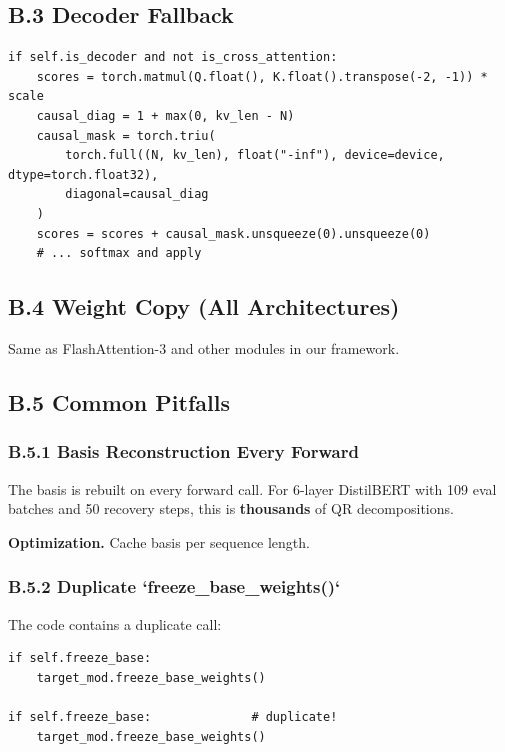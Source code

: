 \subsection{B.3 Decoder Fallback}

\begin{lstlisting}
if self.is_decoder and not is_cross_attention:
    scores = torch.matmul(Q.float(), K.float().transpose(-2, -1)) * scale
    causal_diag = 1 + max(0, kv_len - N)
    causal_mask = torch.triu(
        torch.full((N, kv_len), float("-inf"), device=device, dtype=torch.float32),
        diagonal=causal_diag
    )
    scores = scores + causal_mask.unsqueeze(0).unsqueeze(0)
    # ... softmax and apply
\end{lstlisting}

\subsection{B.4 Weight Copy (All Architectures)}

Same as FlashAttention-3 and other modules in our framework.

\subsection{B.5 Common Pitfalls}

\subsubsection{B.5.1 Basis Reconstruction Every Forward}

The basis is rebuilt on every forward call. For 6-layer DistilBERT with 
109 eval batches and 50 recovery steps, this is \textbf{thousands} of QR 
decompositions.

\textbf{Optimization.} Cache basis per sequence length.

\subsubsection{B.5.2 Duplicate `freeze\_base\_weights()`}

The code contains a duplicate call:

\begin{lstlisting}
if self.freeze_base:
    target_mod.freeze_base_weights()

if self.freeze_base:              # duplicate!
    target_mod.freeze_base_weights()
\end{lstlisting}


